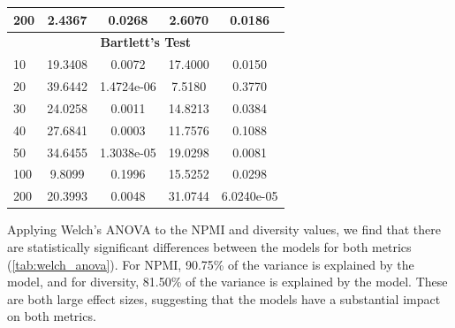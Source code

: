\begin{table}[htbp]
\begin{tabular}{@{}lcc|cc@{}}
        200                 & 2.4367                            & 0.0268                                 & 2.6070             & 0.0186           \\ \midrule
        \multicolumn{5}{c}{\textbf{Bartlett's Test}}                                                                                             \\ \midrule
        10                  & 19.3408                           & 0.0072                                 & 17.4000            & 0.0150           \\
        20                  & 39.6442                           & 1.4724e-06                             & 7.5180             & 0.3770           \\
        30                  & 24.0258                           & 0.0011                                 & 14.8213            & 0.0384           \\
        40                  & 27.6841                           & 0.0003                                 & 11.7576            & 0.1088           \\
        50                  & 34.6455                           & 1.3038e-05                             & 19.0298            & 0.0081           \\
        100                 & 9.8099                            & 0.1996                                 & 15.5252            & 0.0298           \\
        200                 & 20.3993                           & 0.0048                                 & 31.0744            & 6.0240e-05       \\ \bottomrule
    \end{tabular}
    \label{tab:levene_bartlett}
\end{table}

Applying Welch's ANOVA to the NPMI and diversity values, we find that there are statistically significant differences between the models for both metrics (\cref{tab:welch_anova}). For NPMI, 90.75\% of the variance is explained by the model, and for diversity, 81.50\% of the variance is explained by the model. These are both large effect sizes, suggesting that the models have a substantial impact on both metrics.

